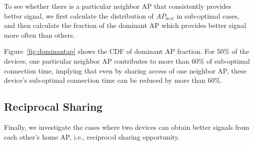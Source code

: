 To see whether there is a particular neighbor AP that consistently provides
better signal, we first calculate the distribution of $AP_{best}$ in sub-optimal
cases, and then calculate the fraction of the dominant AP which provides better
signal more often than others.

Figure~\ref{fig:dominantap} shows the CDF of dominant AP fraction. For 50\% of
the devices, one particular neighbor AP contributes to more than 60\% of
sub-optimal connection time, implying that even by sharing \wifi{} access of one
neighbor AP, these device's sub-optimal connection time can be reduced by more
than 60\%.

\subsection{Reciprocal Sharing}
\label{subsec:reciprocal}

Finally, we investigate the cases where two devices can obtain better signals
from each other's home AP, i.e., reciprocal sharing opportunity.

\newpage
\clearpage

